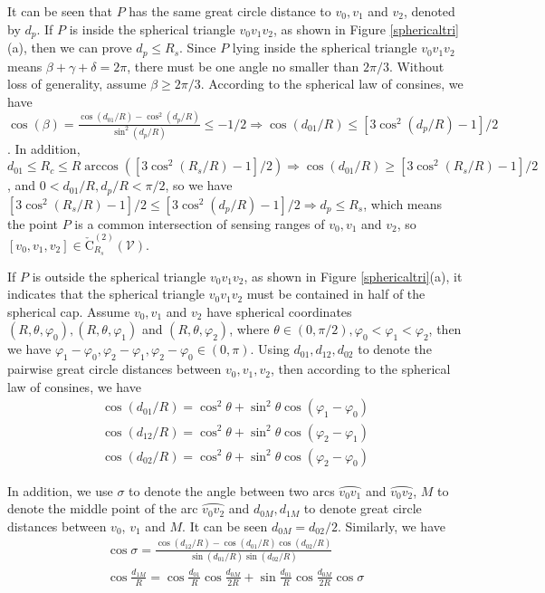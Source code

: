 \documentclass[journal, twoside]{IEEEtran}
\begin{document}
\begin{IEEEproof}
It can be seen that $P$ has the same 
great circle distance to $v_0, v_1$ and $v_2$, denoted by $d_p$. If $P$ is inside
the spherical triangle $v_0v_1v_2$, as shown in Figure \ref{sphericaltri}(a), then we can prove $d_p \leq R_s $. Since
$P$ lying inside the spherical triangle $v_0v_1v_2$ means $\beta + \gamma + \delta = 2\pi$,
there must be one angle no smaller than $2\pi/3$. Without loss of generality, assume
$\beta \geq 2\pi/3$. According to  the spherical law of consines, we have
$\cos(\beta) = \frac{\cos(d_{01}/R) - \cos^2(d_p/R)}{\sin^2(d_p/R)} \leq -1/2
\Rightarrow \cos (d_{01}/R) \leq [3\cos^2 (d_p/R) - 1]/2$. In addition,
$d_{01} \leq R_c \leq R \arccos ([3\cos^2(R_s/R)-1]/2) \Rightarrow 
\cos (d_{01}/R) \geq [3\cos^2(R_s/R)-1]/2$, and $0< d_{01}/R, d_p/R < \pi/2$, so we have
$[3\cos^2(R_s/R)-1]/2 \leq [3\cos^2 (d_p/R) - 1]/2 \Rightarrow 
d_p \leq R_s$, which means the point $P$ is a common intersection
of sensing ranges of $v_0, v_1$ and $v_2$, so $[v_0,v_1,v_2] \in \check{\textrm{C}}_{R_s}^{(2)}(\mathcal{V})$.

If $P$ is outside the spherical triangle $v_0v_1v_2$, as shown in Figure \ref{sphericaltri}(a), 
it indicates that the spherical triangle $v_0v_1v_2$
must be contained in half of the spherical cap. Assume $v_0, v_1$ and $v_2$ have spherical
coordinates $(R, \theta, \varphi_0), (R, \theta, \varphi_1)$ and $(R, \theta, \varphi_2)$, where
$\theta \in (0, \pi/2), \varphi_0 < \varphi_1 < \varphi_2$, then we have $\varphi_1 - \varphi_0, 
\varphi_2 - \varphi_1, \varphi_2 - \varphi_0 \in (0, \pi)$. Using $d_{01}, d_{12}, d_{02}$ to denote
the pairwise great circle distances between $v_0, v_1, v_2$, then according to 
the spherical law of consines, we have 
\begin{eqnarray}
\cos (d_{01}/R) = \cos^2 \theta + \sin^2 \theta \cos(\varphi_1 - \varphi_0) \label{eqapp1}\\
\cos (d_{12}/R) = \cos^2 \theta + \sin^2 \theta \cos(\varphi_2 - \varphi_1) \label{eqapp2}\\
\cos (d_{02}/R) = \cos^2 \theta + \sin^2 \theta \cos(\varphi_2 - \varphi_0) \label{eqapp3}
\end{eqnarray}

In addition, we use $\sigma$ to denote the angle between two arcs $\wideparen{v_0v_1}$ and $\wideparen{v_0v_2}$,
$M$ to denote the middle point of the arc $\wideparen{v_0v_2}$ and $d_{0M}, d_{1M}$ to 
denote great circle distances between $v_0$, $v_1$ and $M$. It can be seen $d_{0M} = d_{02}/2$.
Similarly, we have 
\begin{eqnarray}
 \cos \sigma = \frac{ \cos (d_{12}/R) - \cos (d_{01}/R) \cos (d_{02}/R)}{\sin (d_{01}/R) \sin (d_{02}/R)} \label{eqapp4} \\
 \cos \frac{d_{1M}}{R} = \cos \frac {d_{01}}{R} \cos \frac{d_{0M}}{2R} + \sin \frac{d_{01}}{R} \cos \frac{d_{0M}}{2R} \cos \sigma \label{eqapp5}
\end{eqnarray}


\end{IEEEproof}
\end{document}
